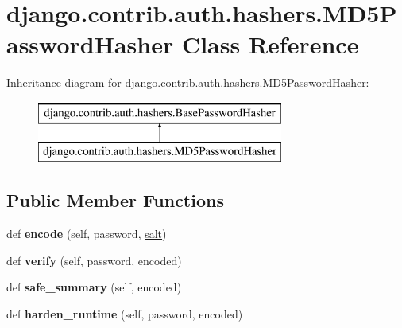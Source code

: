 \hypertarget{classdjango_1_1contrib_1_1auth_1_1hashers_1_1_m_d5_password_hasher}{}\section{django.\+contrib.\+auth.\+hashers.\+M\+D5\+Password\+Hasher Class Reference}
\label{classdjango_1_1contrib_1_1auth_1_1hashers_1_1_m_d5_password_hasher}
Inheritance diagram for django.\+contrib.\+auth.\+hashers.\+M\+D5\+Password\+Hasher\+:\begin{figure}[H]
\begin{center}
\leavevmode
\includegraphics[height=2.000000cm]{classdjango_1_1contrib_1_1auth_1_1hashers_1_1_m_d5_password_hasher}
\end{center}
\end{figure}
\subsection*{Public Member Functions}
\begin{DoxyCompactItemize}
\item 
\mbox{\label{classdjango_1_1contrib_1_1auth_1_1hashers_1_1_m_d5_password_hasher_a2940931be393b01f9017707339c0ee12}} 
def {\bfseries encode} (self, password, \mbox{\hyperlink{classdjango_1_1contrib_1_1auth_1_1hashers_1_1_base_password_hasher_a6761698d81d6070e4aa046fe6b7116f7}{salt}})
\item 
\mbox{\label{classdjango_1_1contrib_1_1auth_1_1hashers_1_1_m_d5_password_hasher_a58cef15ef992c0f16395d7e01bbfdadc}} 
def {\bfseries verify} (self, password, encoded)
\item 
\mbox{\label{classdjango_1_1contrib_1_1auth_1_1hashers_1_1_m_d5_password_hasher_a95c1ea0d9bc8b1c674cfca3652fccb37}} 
def {\bfseries safe\+\_\+summary} (self, encoded)
\item 
\mbox{\label{classdjango_1_1contrib_1_1auth_1_1hashers_1_1_m_d5_password_hasher_aac19b4d4b884180e6a1b4e1cff34c512}} 
def {\bfseries harden\+\_\+runtime} (self, password, encoded)
\end{DoxyCompactItemize}
